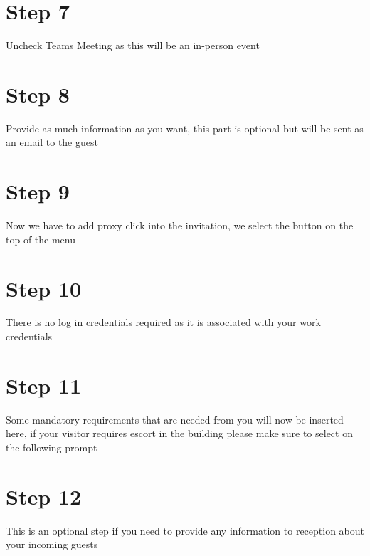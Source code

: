 \documentclass{../lib/lib-en}
\begin{document}

\newpage
\section*{\centering Step 7}
Uncheck Teams Meeting as this will be an in-person event


\newpage
\section*{\centering Step 8}
Provide as much information as you want, this part is optional but will be sent as an email to the guest


\newpage
\section*{\centering Step 9}
Now we have to add proxy click into the invitation, we select the  button on the top of the menu


\newpage
\section*{\centering Step 10}
There is no log in credentials required as it is associated with your work credentials


\newpage
\section*{\centering Step 11}
Some mandatory requirements that are needed from you will now be inserted here, if your visitor requires escort in the building please make sure to select  on the following prompt


\newpage
\section*{\centering Step 12}
This is an optional step if you need to provide any information to reception about your incoming guests
\end{document}
